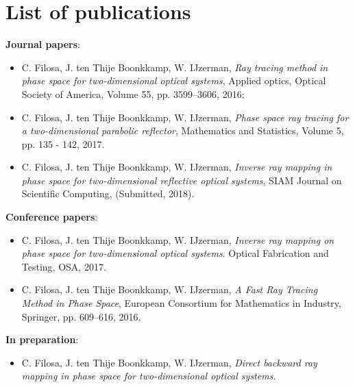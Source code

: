 
\chapter*{List of publications}
\markboth{}{}
\noindent \textbf{Journal papers}:
\begin{itemize}
\item C. Filosa, J. ten Thije Boonkkamp, W. IJzerman,
\emph{Ray tracing method in phase space for two-dimensional optical systems}, Applied optics, Optical Society of America,
  Volume 55, pp. 3599--3606, 2016;

\item  C. Filosa, J. ten Thije Boonkkamp, W. IJzerman, 
  \emph{Phase space ray tracing for a two-dimensional parabolic reflector},
Mathematics and Statistics, Volume 5, pp. 135 - 142, 2017.
\item  C. Filosa, J. ten Thije Boonkkamp, W. IJzerman, \emph{Inverse ray mapping in phase space for two-dimensional reflective optical systems}, SIAM Journal on Scientific Computing, (Submitted, 2018).
\end{itemize}
\noindent \textbf{Conference papers}:
\begin{itemize}
\item
  C. Filosa, J. ten Thije Boonkkamp, W. IJzerman,  \emph{Inverse ray mapping on phase space for two-dimensional optical systems}.
  Optical Fabrication and Testing, OSA, 2017. 
\item  C. Filosa, J. ten Thije Boonkkamp, W. IJzerman, \emph{A Fast Ray Tracing Method in Phase Space}, European Consortium for Mathematics in Industry, Springer, pp. 609--616, 2016.
\end{itemize}
\noindent \textbf{In preparation}:
\begin{itemize}
\item  C. Filosa, J. ten Thije Boonkkamp, W. IJzerman, \emph{Direct backward ray mapping in phase space for two-dimensional optical systems}.
\end{itemize}
